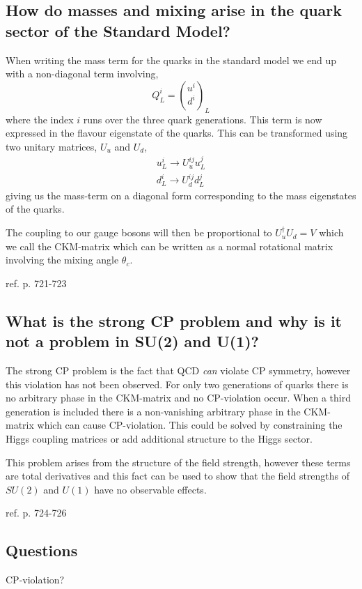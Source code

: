 \documentclass[paper=a4, fontsize=11pt]{scrartcl} %
\numberwithin{equation}{section} %
\numberwithin{figure}{section} %
\numberwithin{table}{section} %
\begin{document}
\subsection{How do masses and mixing arise in the quark sector of the Standard Model?}
When writing the mass term for the quarks in the standard model we end up with a non-diagonal term involving,
\begin{equation}
Q^i_L = {u^i \choose d^i}_L
\end{equation}
where the index $i$ runs over the three quark generations. This term is now expressed in the flavour eigenstate of the quarks. This can be transformed using two unitary matrices, $U_u$ and $U_d$,
\begin{equation}
\begin{split}
u^i_L \rightarrow U^{ij}_u u^j_L \\
d^i_L \rightarrow U^{ij}_d d^j_L
\end{split}
\end{equation}
giving us the mass-term on a diagonal form corresponding to the mass eigenstates of the quarks. 

The coupling to our gauge bosons will then be proportional to $U_u^{\dagger}U_d = V$ which we call the CKM-matrix which can be written as a normal rotational matrix involving the mixing angle $\theta_c$.

ref. p. 721-723

\subsection{What is the strong CP problem and why is it not a problem in SU(2) and U(1)?}
The strong CP problem is the fact that QCD \textit{can} violate CP symmetry, however this violation has not been observed. For only two generations of quarks there is no arbitrary phase in the CKM-matrix and no CP-violation occur. When a third generation is included there is a non-vanishing arbitrary phase in the CKM-matrix which can cause CP-violation. This could be solved by constraining the Higgs coupling matrices or add additional structure to the Higgs sector. 

This problem arises from the structure of the field strength, however these terms are total derivatives and this fact can be used to show that the field strengths of $SU(2)$ and $U(1)$ have no observable effects. 

ref. p. 724-726

\subsection{Questions}
CP-violation?
\end{document}
